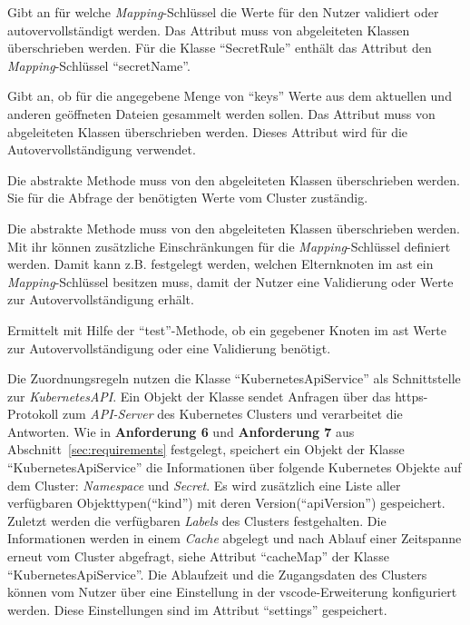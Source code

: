 \begin{description}
  \setlength\itemsep{-0.5cm}
  \item[keys]
        Gibt an für welche \textit{Mapping}-Schlüssel die Werte für den Nutzer validiert oder autovervollständigt werden.
        Das Attribut muss von abgeleiteten Klassen überschrieben werden.
        Für die Klasse ``SecretRule'' enthält das Attribut den \textit{Mapping}-Schlüssel ``secretName''.
  \item[shouldCollectValuesFromDocuments]
        Gibt an, ob für die angegebene Menge von ``keys'' Werte aus dem aktuellen und anderen geöffneten Dateien gesammelt werden sollen.
        Das Attribut muss von abgeleiteten Klassen überschrieben werden. Dieses Attribut wird für die Autovervollständigung verwendet.
  \item[getApiCompletionValues]
        Die abstrakte Methode muss von den abgeleiteten Klassen überschrieben werden. Sie für die Abfrage der benötigten Werte vom Cluster zuständig.
  \item[test]
        Die abstrakte Methode muss von den abgeleiteten Klassen überschrieben werden. Mit ihr können zusätzliche Einschränkungen
        für die \textit{Mapping}-Schlüssel definiert werden. Damit kann z.B. festgelegt werden, welchen Elternknoten im \ac{ast}
        ein \textit{Mapping}-Schlüssel besitzen muss, damit der Nutzer eine Validierung oder Werte zur Autovervollständigung erhält.
  \item[isApplicable]
        Ermittelt mit Hilfe der ``test''-Methode, ob ein gegebener Knoten im \ac{ast} Werte zur Autovervollständigung oder eine Validierung benötigt.
\end{description}

Die Zuordnungsregeln nutzen die Klasse ``KubernetesApiService'' als Schnittstelle zur \textit{KubernetesAPI}.
Ein Objekt der Klasse sendet Anfragen über das \ac{https}-Protokoll zum \textit{API-Server}
des Kubernetes Clusters und verarbeitet die Antworten. Wie in \textbf{Anforderung 6} und \textbf{Anforderung 7} aus Abschnitt~\ref{sec:requirements} festgelegt,
speichert ein Objekt der Klasse ``KubernetesApiService'' die Informationen über folgende Kubernetes Objekte auf dem Cluster: \textit{Namespace} und \textit{Secret}.
Es wird zusätzlich eine Liste aller verfügbaren Objekttypen(``kind'') mit deren Version(``apiVersion'') gespeichert.
Zuletzt werden die verfügbaren \textit{Labels} des Clusters festgehalten.
Die Informationen werden in einem \textit{Cache} abgelegt und nach Ablauf einer Zeitspanne erneut vom Cluster abgefragt, siehe
Attribut ``cacheMap'' der Klasse ``KubernetesApiService''.
Die Ablaufzeit und die Zugangsdaten des Clusters können vom Nutzer über eine Einstellung in der \ac{vscode}-Erweiterung
konfiguriert werden. Diese Einstellungen sind im Attribut ``settings'' gespeichert.

